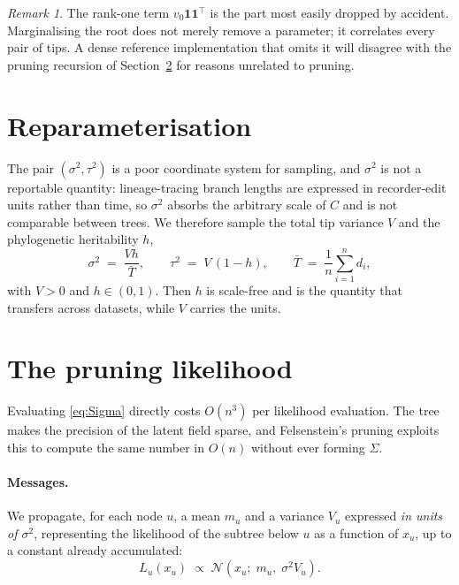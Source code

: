 \documentclass[11pt]{article}
\theoremstyle{remark}
\newtheorem{remark}[proposition]{Remark}
\newcommand{\Norm}{\mathcal{N}}
\newcommand{\one}{\mathbf{1}}
\begin{document}
\begin{remark}
The rank-one term $v_0 \one\one^{\!\top}$ is the part most easily dropped by accident.
Marginalising the root does not merely remove a parameter; it correlates every pair of tips.
A dense reference implementation that omits it will disagree with the pruning recursion of
Section~\ref{sec:pruning} for reasons unrelated to pruning.
\end{remark}

\section{Reparameterisation}

The pair $(\sigma^2, \tau^2)$ is a poor coordinate system for sampling, and $\sigma^2$ is not a
reportable quantity: lineage-tracing branch lengths are expressed in recorder-edit units rather than
time, so $\sigma^2$ absorbs the arbitrary scale of $C$ and is not comparable between trees. We
therefore sample the total tip variance $V$ and the phylogenetic heritability $h$,
\begin{equation}
  \sigma^2 \;=\; \frac{V h}{\bar{T}}, \qquad
  \tau^2   \;=\; V\,(1-h), \qquad
  \bar{T} \;=\; \frac{1}{n}\sum_{i=1}^n d_i ,
  \label{eq:reparam}
\end{equation}
with $V > 0$ and $h \in (0,1)$. Then $h$ is scale-free and is the quantity that transfers across
datasets, while $V$ carries the units.

\section{The pruning likelihood}
\label{sec:pruning}

Evaluating \eqref{eq:Sigma} directly costs $O(n^3)$ per likelihood evaluation. The tree makes the
precision of the latent field sparse, and Felsenstein's pruning exploits this to compute the same
number in $O(n)$ without ever forming $\Sigma$.

\paragraph{Messages.} We propagate, for each node $u$, a mean $m_u$ and a variance $V_u$ expressed
\emph{in units of $\sigma^2$}, representing the likelihood of the subtree below $u$ as a function of
$x_u$, up to a constant already accumulated:
\begin{equation}
  L_u(x_u) \;\propto\; \Norm\!\left(x_u;\; m_u,\; \sigma^2 V_u\right).
\end{equation}
\end{document}
